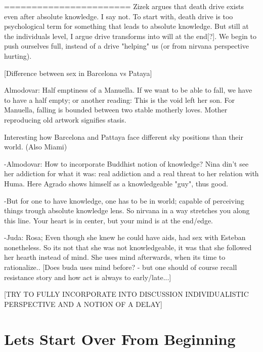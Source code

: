 \documentclass[10pt]{book}
\begin{document}
=======================
Zizek argues that death drive exists even after absolute knowledge. I say not. To start with, death drive is too psychological term for something that leads to absolute knowledge. But still at the individuals level, I argue drive transforms into will at the end[?]. We begin to push ourselves full, instead of a drive "helping" us (or from nirvana perspective hurting). 

[Difference between sex in Barcelona vs Pataya]

Almodovar: Half emptiness of a Manuella. If we want to be able to fall, we have to have a half empty; or another reading: This is the void left her son.
For Manuella, falling is bounded between two stable motherly loves.
Mother reproducing old artwork signifies stasis.

Interesting how Barcelona and Pattaya face different sky positions than their world. (Also Miami)

-Almodovar: How to incorporate Buddhist notion of knowledge? Nina din't see her addiction for what it was: real addiction and a real threat to her relation with Huma. Here Agrado shows himself as a knowledgeable "guy", thus good.

-But for one to have knowledge, one has to be in world; capable of perceiving things trough absolute knowledge lens. So nirvana in a way stretches you along this line. Your heart is in center, but your mind is at the end/edge.

-Juda: Rosa; Even though she knew he could have aids, had sex with Esteban nonetheless. So its not that she was not knowledgeable, it was that she followed her hearth instead of mind. She uses mind afterwards, when its time to rationalize.. [Does buda uses mind before? - but one should of course recall resistance story and how act is always to early/late...] 

[TRY TO FULLY INCORPORATE INTO DISCUSSION INDIVIDUALISTIC PERSPECTIVE AND A NOTION OF A DELAY]

\chapter{Lets Start Over From Beginning}
\end{document}
